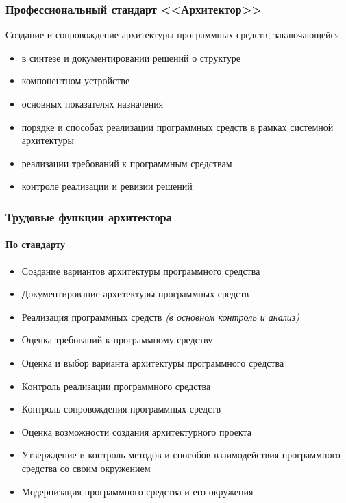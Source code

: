 \documentclass[xetex,mathserif,serif]{beamer}
\begin{document}
	\begin{frame}
		\frametitle{Профессиональный стандарт <<Архитектор>>}
		Создание и сопровождение архитектуры программных средств, заключающейся
		\begin{itemize}
			\item в синтезе и документировании решений о структуре
			\item компонентном устройстве
			\item основных показателях назначения
			\item порядке и способах реализации программных средств в рамках системной архитектуры
			\item реализации требований к программным средствам
			\item контроле реализации и ревизии решений
		\end{itemize}
	\end{frame}

	\begin{frame}
		\frametitle{Трудовые функции архитектора}
		\framesubtitle{По стандарту}
		\begin{itemize}
			\item Создание вариантов архитектуры программного средства
			\item Документирование архитектуры программных средств
			\item Реализация программных средств \textit{(в основном контроль и анализ)}
			\item Оценка требований к программному средству
			\item Оценка и выбор варианта архитектуры программного средства
			\item Контроль реализации программного средства
			\item Контроль сопровождения программных средств
			\item Оценка возможности создания архитектурного проекта
			\item Утверждение и контроль методов и способов взаимодействия программного средства со своим окружением
			\item Модернизация программного средства и его окружения
		\end{itemize}
	\end{frame}
\end{document}
